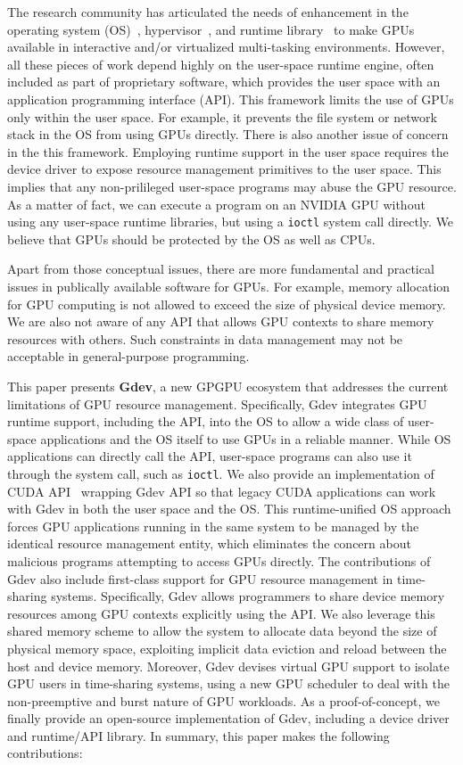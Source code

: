 The research community has articulated the needs of enhancement in 
the operating system (OS)~\cite{Bautin_MCNC08, Kato_ATC11,
Rossbach_SOSP11}, hypervisor~\cite{Gupta_ATC11}, and runtime
library~\cite{Kato_RTSS11} to make GPUs available in interactive
and/or virtualized multi-tasking environments.
However, all these pieces of work depend highly on the user-space runtime
engine, often included as part of proprietary software, which provides
the user space with an application programming interface (API).
This framework limits the use of GPUs only within the user space.
For example, it prevents the file system or network stack in the OS from
using GPUs directly.
There is also another issue of concern in the this framework.
Employing runtime support in the user space requires the device driver
to expose resource management primitives to the user space.
This implies that any non-prilileged user-space programs may abuse the
GPU resource. 
As a matter of fact, we can execute a program on an NVIDIA GPU without
using any user-space runtime libraries, but using a \texttt{ioctl}
system call directly. 
We believe that GPUs should be protected by the OS as well as CPUs.

Apart from those conceptual issues, there are more fundamental and
practical issues in publically available software for GPUs.
For example, memory allocation for GPU computing is not allowed to
exceed the size of physical device memory.
We are also not aware of any API that allows GPU contexts to share
memory resources with others.
Such constraints in data management may not be acceptable in
general-purpose programming.

This paper presents \textbf{Gdev}, a new GPGPU ecosystem that addresses
the current limitations of GPU resource management.
Specifically, Gdev integrates GPU runtime support, including the API,
into the OS to allow a wide class of user-space applications and the OS
itself to use GPUs in a reliable manner.
While OS applications can directly call the API, user-space
programs can also use it through the system call, such as
\texttt{ioctl}.
We also provide an implementation of CUDA API~\cite{CUDA40} wrapping
Gdev API so that legacy CUDA applications can work with Gdev in both the
user space and the OS.
This runtime-unified OS approach forces GPU applications running in
the same system to be managed by the identical resource management
entity, which eliminates the concern about malicious programs attempting
to access GPUs directly.
The contributions of Gdev also include first-class support for GPU
resource management in time-sharing systems.
Specifically, Gdev allows programmers to share device memory resources
among GPU contexts explicitly using the API. 
We also leverage this shared memory scheme to allow the system to allocate
data beyond the size of physical memory space, exploiting implicit data
eviction and reload between the host and device memory.
Moreover, Gdev devises virtual GPU support to isolate GPU users in
time-sharing systems, using a new GPU scheduler to deal with the
non-preemptive and burst nature of GPU workloads.
As a proof-of-concept, we finally provide an open-source implementation of Gdev,
including a device driver and runtime/API library.
In summary, this paper makes the following contributions:

